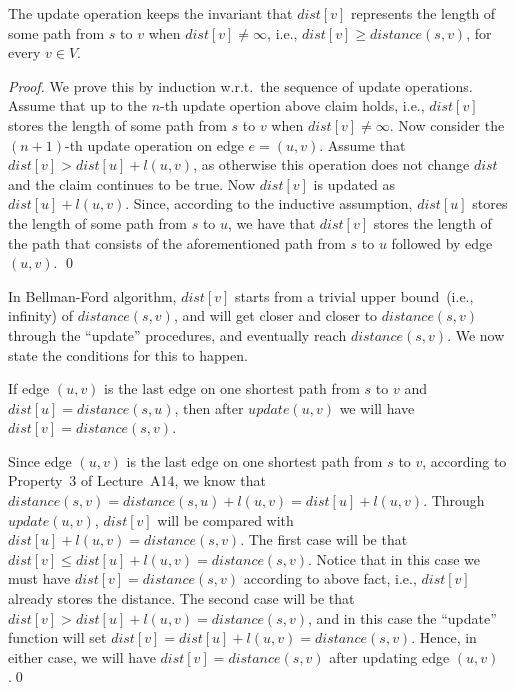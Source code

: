 \begin{fact}
\label{bf-fact2}
The update operation keeps the invariant that $dist[v]$ represents the length of some path from $s$ to $v$ when $dist[v] \neq \infty$, i.e., $dist[v] \ge distance(s,v)$, for every $v\in V$.
\end{fact}
\emph{Proof.} We prove this by induction w.r.t.\ the sequence of update operations. Assume that up to the $n$-th update opertion
above claim holds, i.e., $dist[v]$ stores the length of some path from $s$ to $v$ when $dist[v] \neq \infty$.
Now consider the $(n+1)$-th update operation on edge $e = (u,v)$. Assume that $dist[v] > dist[u] + l(u,v)$, as otherwise this operation does not change $dist$ 
and the claim continues to be true.
Now $dist[v]$ is updated as $dist[u] + l(u,v)$. Since, according to the inductive assumption, $dist[u]$ stores the length of some path from $s$ to $u$,
we have that $dist[v]$ stores the length of the path that consists of the aforementioned path from $s$ to $u$ followed by edge $(u,v)$. \qed

In Bellman-Ford algorithm, $dist[v]$ starts from a trivial upper bound~(i.e., infinity) of $distance(s,v)$,
and will get closer and closer to $distance(s,v)$ through the ``update'' procedures,
and eventually reach $distance(s, v)$.  We now state the conditions for this to happen.

\begin{fact}
\label{fact3}
If edge $(u,v)$ is the last edge on one shortest path from $s$ to $v$ and $dist[u] = distance(s,u)$, then after $update(u,v)$ we will have $dist[v] = distance(s,v)$.
\end{fact}
Since edge $(u,v)$ is the last edge on one shortest path from $s$ to $v$, according to Property~3 of Lecture~A14, we know that
$distance(s,v) = distance(s,u) + l(u,v) = dist[u] + l(u,v)$. Through $update(u,v)$, $dist[v]$ will be compared with $dist[u] + l(u,v) = distance(s,v)$.
The first case will be that $dist[v] \le dist[u] + l(u,v) = distance(s,v)$. Notice that in this case we must have 
$dist[v] = distance(s,v)$ according to above fact, i.e., $dist[v]$ already stores the distance.
The second case will be that $dist[v] > dist[u] + l(u,v) = distance(s,v)$, and in this case the ``update'' function
will set $dist[v] = dist[u] + l(u,v) = distance(s,v)$. 
Hence, in either case, we will have $dist[v] = distance(s,v)$ after updating edge $(u,v)$.\qed



